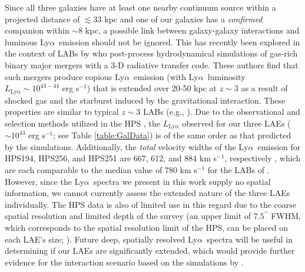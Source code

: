 \documentclass{emulateapj}
\newcommand{\lya}{Ly$\alpha$}
\def\arcsec{^{\prime\prime}}
\begin{document}
Since all three galaxies have at least one nearby continuum source within a projected distance of $\lesssim33$ kpc and one of our galaxies has a \textit{confirmed} companion within $\sim8$ kpc, a possible link between galaxy-galaxy interactions and luminous \lya\ emission should not be ignored. This has recently been explored in the context of LABs by \citet{yajima2012} who post-process hydrodynamical simulations of gas-rich binary major mergers with a 3-D radiative transfer code. These authors find that such mergers produce copious \lya\ emission (with \lya\ luminosity $L_{\mathrm{Ly}\alpha} \sim 10^{43-44}$ erg s$^{-1}$) that is extended over 20-50 kpc at $z\sim3$ as a result of shocked gas and the starburst induced by the gravitational interaction. These properties are similar to typical $z\sim3$ LABs (e.g., \citealp{matsuda2006}). Due to the observational and selection methods utilized in the HPS \citep{adams2011}, the $L_{\mathrm{Ly}\alpha}$ observed for our three LAEs ($\sim 10^{43}$ erg s$^{-1}$; see Table \ref{table:GalData}) is of the same order as that predicted by the \citet{yajima2012} simulations. Additionally, the \textit{total} velocity widths of the \lya\ emission for HPS194, HPS256, and HPS251 are 667, 612, and 884 km s$^{-1}$, respectively \citep{adams2011}, which are each comparable to the median value of 780 km s$^{-1}$ for the LABs of \citet{matsuda2006}. However, since the \lya\ spectra we present in this work supply no spatial information, we cannot currently assess the extended nature of the three LAEs individually. The HPS data is also of limited use in this regard due to the coarse spatial resolution and limited depth of the survey (an upper limit of $7.5\arcsec$ FWHM, which corresponds to the spatial resolution limit of the HPS, can be placed on each LAE's size; \citealp{adams2011}). Future deep, spatially resolved \lya\ spectra will be useful in determining if our LAEs are significantly extended, which would provide further evidence for the interaction scenario based on the simulations by \citet{yajima2012}.
\end{document}
